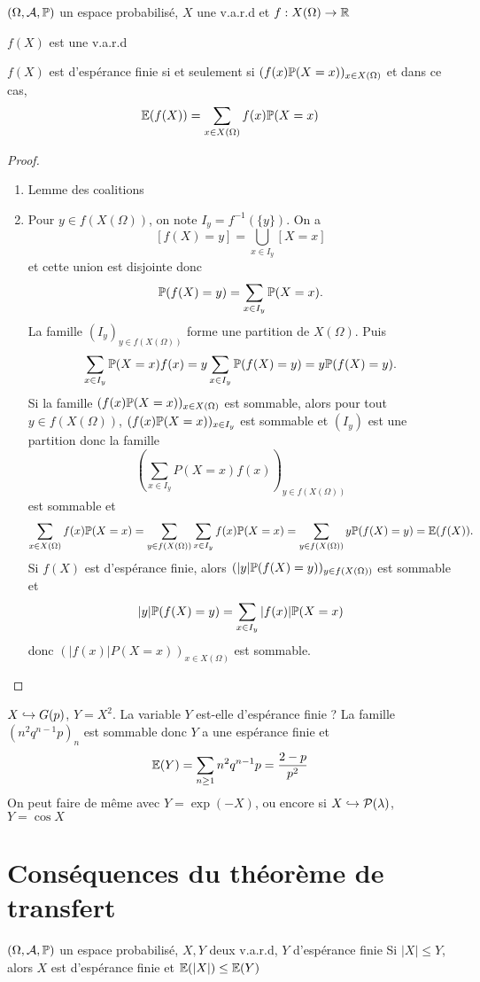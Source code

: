 \begin{thm}
    \Hyp $(\Omega, \mathcal  A, \P)$ un espace probabilisé, $X$ une v.a.r.d et  $f:X(\Omega)\to \R$
    \begin{concenum}
    \item $f(X)$ est une v.a.r.d
    \item  $f(X)$ est d'espérance finie  si et seulement si $(f(x)\P(X=x))_{x\in X(\Omega)}$ et dans ce cas, \[
            \E(f(X))=\sum_{x\in X(\Omega)}f(x)\P(X=x)
    \] 
    \end{concenum}
\end{thm}

\begin{proof}~
    \begin{enumerate}
        \item Lemme des coalitions
        \item Pour $y\in f(X(\Omega))$, on note $I_y=f^{-1}(\{y\} )$. On a \[
                [f(X)=y]=\bigcup_{x\in I_y}[X=x] 
        \] 
        et cette union est disjointe donc \[
            \P(f(X)=y)=\sum_{x\in I_y}\P(X=x).
        \]
        La famille $(I_y)_{y\in f(X(\Omega))}$ forme une partition de $X(\Omega)$. Puis  \[
            \sum_{x \in  I_y}\P(X=x)f(x)=y\sum_{x\in I_y}\P(f(X)=y)=y\P(f(X)=y).
        \] Si la famille $(f(x)\P(X=x))_{x \in  X(\Omega)}$ est sommable, alors pour tout $y\in f(X(\Omega))$, $(f(x)\P(X=x))_{x\in I_y}$ est sommable et $(I_y)$ est une partition donc la famille  \[
        \left( \sum_{x \in  I_y} P(X=x)f(x)\right) _{y\in f(X(\Omega))}
        \] 
        est sommable et \[
            \sum_{x\in X(\Omega)}f(x)\P(X=x)=\sum_{y\in f(X(\Omega))}\sum_{x \in  I_y}f(x)\P(X=x)=\sum_{y\in f(X(\Omega))}y\P(f(X)=y)=\E(f(X)).
        \] 
        Si $f(X)$ est d'espérance finie, alors $(|y|\P(f(X)=y))_{y\in  f(X(\Omega))}$ est sommable et \[
            |y|\P(f(X)=y)=\sum_{x \in  I_y}|f(x)|\P(X=x)
        \] 
        donc $(|f(x)|P(X=x))_{x\in X(\Omega)}$ est sommable.
    \end{enumerate}
\end{proof}

\begin{ex}
    $X\suit G(p)$, $Y=X^2$. La variable $Y$ est-elle d'espérance finie ? La famille $(n^2q^{n-1}p)_n$ est sommable donc $Y$ a une espérance finie et \[
        \E(Y)=\sum_{n\geq 1}n^2q^{n-1}p=\frac{2-p}{p^2}
    \] 
    On peut faire de même avec $Y=\exp (-X)$, ou encore si $X\suit \mathcal  P(\lambda)$, $Y=\cos  X$
\end{ex}

\section{Conséquences du théorème de transfert}

\begin{prop}
    \Hyp $(\Omega, \mathcal  A, \P)$ un espace probabilisé, $X,Y$ deux v.a.r.d, $Y$ d'espérance finie
    \Conc Si  $|X|\leq Y$, alors  $X$ est d'espérance finie et $\E(|X|)\leq \E(Y)$
\end{prop}
